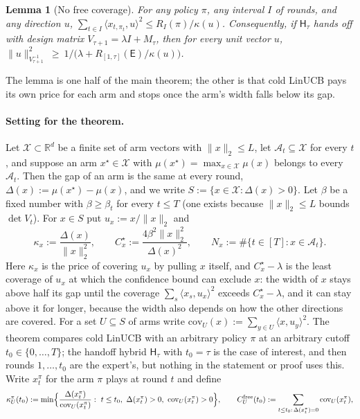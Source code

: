 \documentclass{article}
\newtheorem{lemma}{Lemma}
\theoremstyle{definition}
\theoremstyle{remark}
\newcommand{\R}{\mathbb{R}}
\theoremstyle{remark}
\newcommand{\Exp}{\mathsf{E}}
\newcommand{\Hyb}{\mathsf{H}}
\begin{document}
\begin{lemma}[No free coverage]
\label{lem:no-free-coverage}
For any policy $\pi$, any interval $I$ of rounds, and any direction $u$,
$\sum_{t\in I}\langle x_{t,\pi_t},u\rangle^2\le R_I(\pi)/\kappa(u)$.
Consequently, if $\Hyb_\tau$ hands off with design matrix $V_{\tau+1}=\lambda I+M_\tau$, then
for every unit vector $u$,
$\|u\|^2_{V_{\tau+1}^{-1}}\ \ge\ 1\big/\bigl(\lambda+R_{[1,\tau]}(\Exp)/\kappa(u)\bigr)$.
\end{lemma}

The lemma is one half of the main theorem; the other is that cold LinUCB
pays its own price for each arm and stops once the arm's width falls below
its gap.

\paragraph{Setting for the theorem.}
Let $\mathcal X\subset\R^d$ be a finite set of arm vectors with
$\|x\|_2\le L$, let $\mathcal A_t\subseteq\mathcal X$ for every $t$, and
suppose an arm $x^\star\in\mathcal X$ with
$\mu(x^\star)=\max_{x\in\mathcal X}\mu(x)$ belongs to every $\mathcal A_t$.
Then the gap of an arm is the same at every round,
$\Delta(x):=\mu(x^\star)-\mu(x)$, and we write
$S:=\{x\in\mathcal X:\Delta(x)>0\}$. Let $\beta$ be a fixed number with
$\beta\ge\beta_t$ for every $t\le T$ (one exists because $\|x\|_2\le L$ bounds
$\det V_t$). For $x\in S$ put $u_x:=x/\|x\|_2$ and
\[
\kappa_x:=\frac{\Delta(x)}{\|x\|_2^2},\qquad
C^\star_x:=\frac{4\beta^2\|x\|_2^2}{\Delta(x)^2},\qquad
N_x:=\#\{t\in[T]:x\in\mathcal A_t\}.
\]
Here $\kappa_x$ is the price of covering $u_x$ by pulling $x$ itself, and
$C^\star_x-\lambda$ is the least coverage of $u_x$ at which the confidence
bound can exclude $x$: the width of $x$ stays above half its gap until the
coverage $\sum_s\langle x_s,u_x\rangle^2$ exceeds $C^\star_x-\lambda$, and it
can stay above it for longer, because the width also depends on how the other
directions are covered. For a set $U\subseteq S$ of arms write
$\mathrm{cov}_U(x):=\sum_{y\in U}\langle x,u_y\rangle^2$. The theorem compares
cold LinUCB with an arbitrary policy $\pi$ at an arbitrary cutoff
$t_0\in\{0,\dots,T\}$; the handoff hybrid $\Hyb_\tau$ with $t_0=\tau$ is the
case of interest, and then rounds $1,\dots,t_0$ are the expert's, but nothing
in the statement or proof uses this. Write $x^\pi_t$ for the arm $\pi$ plays
at round $t$ and define
\[
\kappa^\pi_U(t_0):=\min\Bigl\{\frac{\Delta(x^\pi_t)}{\mathrm{cov}_U(x^\pi_t)}:
\ t\le t_0,\ \Delta(x^\pi_t)>0,\ \mathrm{cov}_U(x^\pi_t)>0\Bigr\},
\qquad
C^{\mathrm{free}}_U(t_0):=\sum_{t\le t_0:\,\Delta(x^\pi_t)=0}\mathrm{cov}_U(x^\pi_t),
\]
\end{document}
